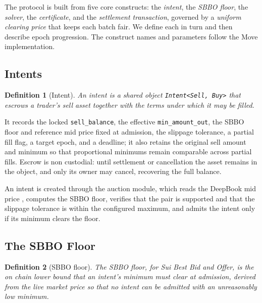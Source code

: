 \documentclass[10pt,sigconf,nonacm]{acmart}
\theoremstyle{reiythm}
\newtheorem{definition}{Definition}
\begin{document}
The protocol is built from five core constructs: the \emph{intent}, the
\emph{SBBO floor}, the \emph{solver}, the \emph{certificate}, and the
\emph{settlement transaction}, governed by a \emph{uniform clearing price} that keeps
each batch fair. We define each in turn and then describe epoch progression. The
construct names and parameters follow the Move implementation.

\subsection{Intents}

\begin{definition}[Intent]
An intent is a shared object \texttt{Intent<Sell, Buy>} that escrows a trader's
sell asset together with the terms under which it may be filled.
\end{definition}

\noindent It records the locked \texttt{sell\_balance}, the effective \texttt{min\_amount\_out},
the SBBO floor and reference mid price fixed at admission, the slippage tolerance,
a partial fill flag, a target epoch, and a deadline; it also retains the original
sell amount and minimum so that proportional minimums remain comparable across
partial fills. Escrow is non custodial: until settlement or cancellation the
asset remains in the object, and only its owner may cancel, recovering the full
balance.

An intent is created through the auction module, which reads the DeepBook mid
price \cite{querypoolsui}, computes the SBBO floor, verifies that the pair is
supported and that the slippage tolerance is within the configured maximum, and
admits the intent only if its minimum clears the floor.

\subsection{The SBBO Floor}

\begin{definition}[SBBO floor]
The SBBO floor, for Sui Best Bid and Offer, is the on chain lower bound that an
intent's minimum must clear at admission, derived from the live market price so
that no intent can be admitted with an unreasonably low minimum.
\end{definition}
\end{document}
